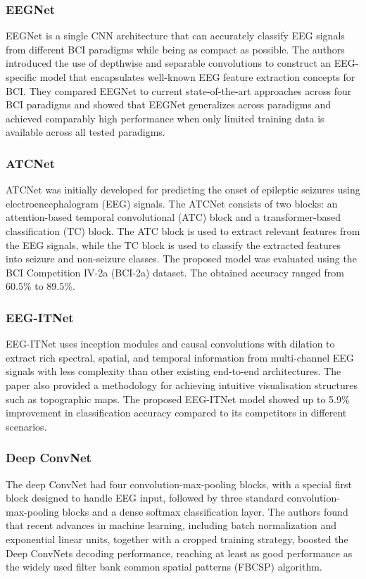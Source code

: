 \documentclass[12pt]{iopart}
\begin{document}
\subsubsection{EEGNet}
EEGNet is a single CNN architecture that can accurately classify EEG signals from different BCI paradigms while being as compact as possible. The authors introduced the use of depthwise and separable convolutions to construct an EEG-specific model that encapsulates well-known EEG feature extraction concepts for BCI. They compared EEGNet to current state-of-the-art approaches across four BCI paradigms and showed that EEGNet generalizes across paradigms and achieved comparably high performance when only limited training data is available across all tested paradigms.

\subsubsection{ATCNet}
ATCNet was initially developed for predicting the onset of epileptic seizures using electroencephalogram (EEG) signals. The ATCNet consists of two blocks: an attention-based temporal convolutional (ATC) block and a transformer-based classification (TC) block. The ATC block is used to extract relevant features from the EEG signals, while the TC block is used to classify the extracted features into seizure and non-seizure classes. The proposed model was evaluated using the BCI Competition IV-2a (BCI-2a) dataset. The obtained accuracy ranged from 60.5\% to 89.5\%.


\subsubsection{EEG-ITNet}
EEG-ITNet uses inception modules and causal convolutions with dilation to extract rich spectral, spatial, and temporal information from multi-channel EEG signals with less complexity than other existing end-to-end architectures. The paper also provided a methodology for achieving intuitive visualisation structures such as topographic maps. The proposed EEG-ITNet model showed up to 5.9\% improvement in classification accuracy compared to its competitors in different scenarios.

\subsubsection{Deep ConvNet}
The deep ConvNet had four convolution-max-pooling blocks, with a special first block designed to handle EEG input, followed by three standard convolution-max-pooling blocks and a dense softmax classification layer. The authors found that recent advances in machine learning, including batch normalization and exponential linear units, together with a cropped training strategy, boosted the Deep ConvNets decoding performance, reaching at least as good performance as the widely used filter bank common spatial patterns (FBCSP) algorithm.
\end{document}
